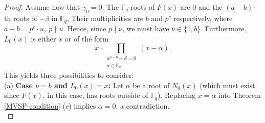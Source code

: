 \documentclass[preprint,12pt]{elsarticle}
\begin{document}
\begin{proof}
    
    Assume now that $\gamma_0 = 0$. The $\mathbb{F}_q$-roots of $F(x)$ are $0$ and the $(a - b)$-th roots of $-\beta$ in $\mathbb{F}_q$. Their multiplicities are $b$ and $p^c$ respectively, where $a - b = p^c \cdot u,\ p \nmid u$. Hence, since $p \nmid \nu$, we must have $\nu \in \{1, b\}$. Furthermore, $L_0(x)$ is either $x$ or of the form 
    $$x \cdot \prod_{\substack{\alpha^{a-b}+\beta=0 \\\alpha \in \mathbb{F}_q}}(x - \alpha).$$
    This yields three possibilities to consider: \\
    
    \noindent (a) \textbf{Case $\nu = b$ and $L_0(x)=x$:} Let $\alpha$ be a root of $N_0(x)$ (which must exist since $F(x)$, in this case, has roots outside of $\mathbb{F}_q$). Replacing $x = \alpha$ into Theorem \ref{MVSP-condition} (e) implies $\alpha = 0$, a contradiction. \\
    

\end{proof}
\end{document}
